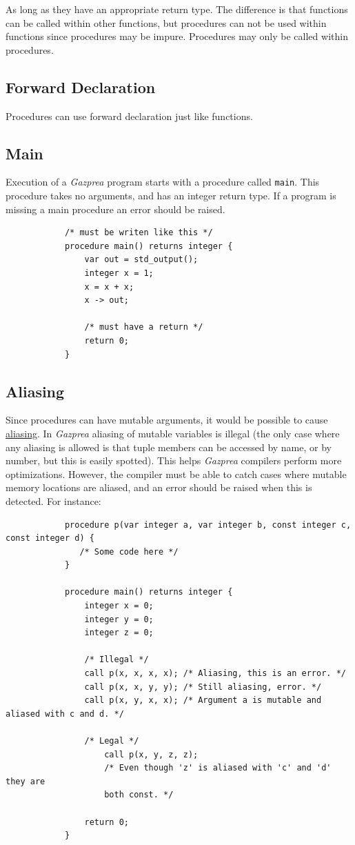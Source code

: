 \documentclass{article}
\begin{document}
		As long as they have an appropriate return type. The difference is that functions can be called within other
		functions, but procedures can not be used within functions since procedures may be impure. Procedures may only
		be called within procedures.


\subsection{Forward Declaration}

	Procedures can use forward declaration just like functions.


	\subsection{Main}

		Execution of a \textit{Gazprea} program starts with a procedure called \texttt{main}. This procedure takes no
		arguments, and has an integer return type. If a program is missing a main procedure an error should be raised.

		\begin{lstlisting}
			/* must be writen like this */
			procedure main() returns integer {
				var out = std_output();
				integer x = 1;
				x = x + x;
				x -> out;

				/* must have a return */
				return 0;
			}
		\end{lstlisting}

	\subsection{Aliasing}

		Since procedures can have mutable arguments, it would be possible to cause
		\href{http://en.wikipedia.org/wiki/Aliasing_(computing)}{aliasing}. In \textit{Gazprea} aliasing of mutable
		variables is illegal (the only case where any aliasing is allowed is that tuple members can be accessed by name,
		or by number, but this is easily spotted). This helps \textit{Gazprea} compilers perform more optimizations.
		However, the compiler must be able to catch cases where mutable memory locations are aliased, and an error
		should be raised when this is detected. For instance:

		\begin{lstlisting}
			procedure p(var integer a, var integer b, const integer c, const integer d) {
			   /* Some code here */
			}

			procedure main() returns integer {
				integer x = 0;
				integer y = 0;
				integer z = 0;

				/* Illegal */
				call p(x, x, x, x); /* Aliasing, this is an error. */
				call p(x, x, y, y); /* Still aliasing, error. */
				call p(x, y, x, x); /* Argument a is mutable and aliased with c and d. */

				/* Legal */
					call p(x, y, z, z);
					/* Even though 'z' is aliased with 'c' and 'd' they are
					both const. */

				return 0;
			}
		\end{lstlisting}
\end{document}

